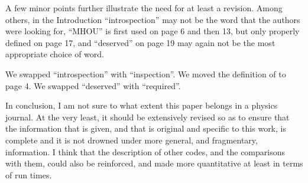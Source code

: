 \documentclass[a4paper,11pt]{article}
\begin{document}
\begin{response}{A few minor points further illustrate the need for at least a revision. Among
others, in the Introduction ``introspection'' may not be the word that the
authors were looking for, ``MHOU'' is first used on page 6 and then 13, but only
properly defined on page 17, and ``deserved'' on page 19 may again not be the
most appropriate choice of word.}

We swapped \enquote{introspection} with \enquote{inspection}.
We moved the definition of \mhou{} to page 4.
We swapped \enquote{deserved} with \enquote{required}.

\end{response}



\begin{response}{In conclusion, I am not sure to what extent this paper belongs in a physics
journal. At the very least, it should be extensively revised so as to ensure
that the information that is given, and that is original and specific to this
work, is complete and it is not drowned under more general, and fragmentary,
information. I think that the description of other codes, and the comparisons
with them, could also be reinforced, and made more quantitative at least in
terms of run times.}


\end{response}
\end{document}
